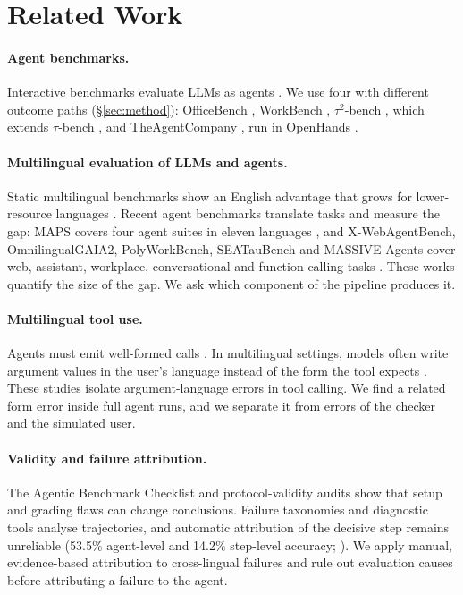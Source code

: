 \documentclass[11pt]{article}
\newcommand{\OB}{OfficeBench}
\newcommand{\WB}{WorkBench}
\newcommand{\TAU}{$\tau^2$-bench}
\newcommand{\TAC}{TheAgentCompany}
\begin{document}
\section{Related Work}

\paragraph{Agent benchmarks.} Interactive benchmarks evaluate LLMs as agents
\citep{liu2023agentbench,zhou2024webarena,xie2024osworld,jimenez2024swebench,mialon2024gaia}.
We use four with different outcome paths (\S\ref{sec:method}): \OB{} \citep{wang2024officebench},
\WB{} \citep{styles2024workbench}, \TAU{} \citep{barres2025tau2}, which extends $\tau$-bench
\citep{yao2024taubench}, and \TAC{} \citep{xu2024theagentcompany}, run in OpenHands
\citep{wang2025openhands}.

\paragraph{Multilingual evaluation of LLMs and agents.} Static multilingual benchmarks show an
English advantage that grows for lower-resource languages
\citep{conneau2018xnli,ahuja2023mega,shi2023mgsm,bandarkar2024belebele,huang2023notall,zhang2023dont,etxaniz2024multilingual}.
Recent agent benchmarks translate tasks and measure the gap: MAPS covers four agent suites in
eleven languages \citep{hofman2026maps}, and X-WebAgentBench, OmnilingualGAIA2, PolyWorkBench,
SEATauBench and MASSIVE-Agents cover web, assistant, workplace, conversational and
function-calling tasks
\citep{wang2025xwebagentbench,caciolai2026omnilingualgaia2,li2026polyworkbench,nguyen2026seataubench,kulkarni2025massiveagents}.
These works quantify the size of the gap. We ask which component of the pipeline produces it.

\paragraph{Multilingual tool use.} Agents must emit well-formed calls
\citep{schick2023toolformer,qin2024toolllm,patil2024gorilla}. In multilingual settings, models
often write argument values in the user's language instead of the form the tool expects
\citep{luo2026lost,chauhan2026api}. These studies isolate argument-language errors in tool
calling. We find a related form error inside full agent runs, and we separate it from errors of
the checker and the simulated user.

\paragraph{Validity and failure attribution.} The Agentic Benchmark Checklist
\citep{zhu2025abc} and protocol-validity audits \citep{shao2026protocol} show that setup and
grading flaws can change conclusions. Failure taxonomies \citep{cemri2025mast} and diagnostic
tools \citep{barke2026agentrx} analyse trajectories, and automatic attribution of the decisive
step remains unreliable (53.5\% agent-level and 14.2\% step-level accuracy;
\citealp{zhang2025whichagent}). We apply manual, evidence-based attribution to cross-lingual
failures and rule out evaluation causes before attributing a failure to the agent.
\end{document}
